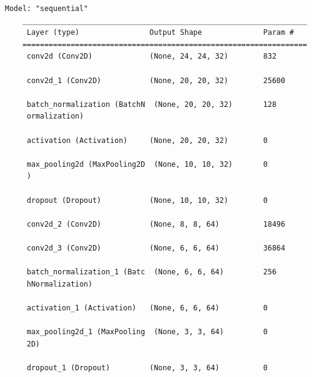 \documentclass{article}
\begin{document}
\begin{lstlisting}[style=siec]
    Model: "sequential"
    _________________________________________________________________
     Layer (type)                Output Shape              Param #   
    =================================================================
     conv2d (Conv2D)             (None, 24, 24, 32)        832       
                                                                     
     conv2d_1 (Conv2D)           (None, 20, 20, 32)        25600     
                                                                     
     batch_normalization (BatchN  (None, 20, 20, 32)       128       
     ormalization)                                                   
                                                                     
     activation (Activation)     (None, 20, 20, 32)        0         
                                                                     
     max_pooling2d (MaxPooling2D  (None, 10, 10, 32)       0         
     )                                                               
                                                                     
     dropout (Dropout)           (None, 10, 10, 32)        0         
                                                                     
     conv2d_2 (Conv2D)           (None, 8, 8, 64)          18496     
                                                                     
     conv2d_3 (Conv2D)           (None, 6, 6, 64)          36864     
                                                                     
     batch_normalization_1 (Batc  (None, 6, 6, 64)         256       
     hNormalization)                                                 
                                                                     
     activation_1 (Activation)   (None, 6, 6, 64)          0         
                                                                     
     max_pooling2d_1 (MaxPooling  (None, 3, 3, 64)         0         
     2D)                                                             
                                                                     
     dropout_1 (Dropout)         (None, 3, 3, 64)          0         
                                                                     

\end{lstlisting}
\end{document}
